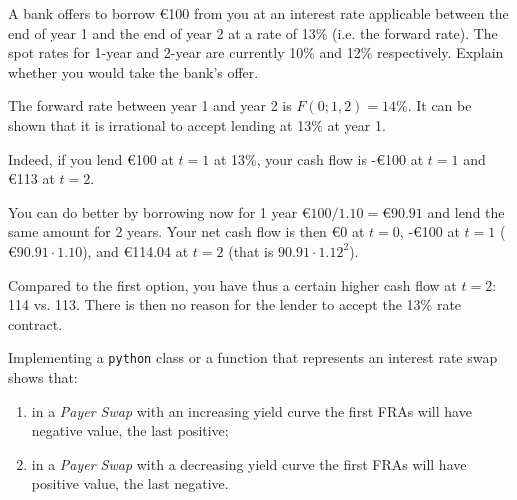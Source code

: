 \documentclass[12pt,a4paper]{book}
\begin{document}
\begin{exercise}[subtitle=Forward Rate]
A bank offers to borrow €100 from you at an interest rate applicable between the end of year 1 and the end of year 2 at a rate of 13\% (i.e. the forward rate). The spot rates for 1-year and 2-year are currently 10\% and 12\% respectively. Explain whether you would take the bank’s offer. 
\end{exercise}
\begin{solution}
The forward rate between year 1 and year 2 is $F(0;1,2)=14\%$. It can be shown that it is irrational to accept lending at 13\% at year 1. 

Indeed, if you lend €100 at $t=1$ at 13\%, your cash flow is -€100 at $t=1$ and €113 at $t=2$.
 
You can do better by borrowing now for 1 year $€100/1.10=€90.91$ and lend the same amount for 2 years. Your net cash flow is then €0 at $t=0$, -€100 at $t=1$ ($€90.91\cdot 1.10$), and €114.04 at $t=2$ (that is $90.91\cdot 1.12^2$). 

Compared to the first option, you have thus a certain higher cash flow at $t=2$: 114 vs. 113.  There is then no reason for the lender to accept the 13\% rate contract. 
\end{solution}

\begin{exercise}[subtitle=IRS as FRA sum (\texttt{python})]
Implementing a \texttt{python} class or a function that represents an interest rate swap shows that:
\begin{enumerate}
\item in a \emph{Payer Swap} with an increasing yield curve the first FRAs will have negative value, the last positive;
\item in a \emph{Payer Swap} with a decreasing yield curve the first FRAs will have positive value, the last negative.
\end{enumerate}
\end{exercise}
\end{document}
